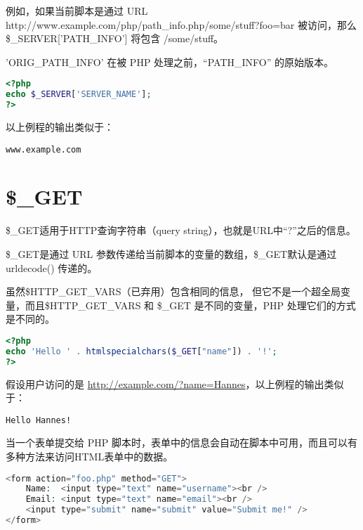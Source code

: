 \begin{compactitem}
例如，如果当前脚本是通过 URL http://www.example.com/php/path\_info.php/some/stuff?foo=bar 被访问，那么 \$\_SERVER['PATH\_INFO'] 将包含 /some/stuff。
\item 'ORIG\_PATH\_INFO'
在被 PHP 处理之前，“PATH\_INFO” 的原始版本。
\end{compactitem}


\begin{lstlisting}[language=PHP]
<?php
echo $_SERVER['SERVER_NAME'];
?>
\end{lstlisting}


以上例程的输出类似于：

\begin{verbatim}
www.example.com
\end{verbatim}


\section{\$\_GET}





\begin{compactitem}
\item \$\_GET适用于HTTP查询字符串（query string），也就是URL中“?”之后的信息。
\item \$\_GET是通过 URL 参数传递给当前脚本的变量的数组，\$\_GET默认是通过 urldecode() 传递的。
\end{compactitem}


虽然\$HTTP\_GET\_VARS（已弃用）包含相同的信息， 但它不是一个超全局变量，而且\$HTTP\_GET\_VARS 和 \$\_GET 是不同的变量，PHP 处理它们的方式是不同的。


\begin{lstlisting}[language=PHP]
<?php
echo 'Hello ' . htmlspecialchars($_GET["name"]) . '!';
?>
\end{lstlisting}


假设用户访问的是 \url{http://example.com/?name=Hannes}，以上例程的输出类似于：

\begin{verbatim}
Hello Hannes!
\end{verbatim}


当一个表单提交给 PHP 脚本时，表单中的信息会自动在脚本中可用，而且可以有多种方法来访问HTML表单中的数据。

\begin{lstlisting}[language=PHP]
<form action="foo.php" method="GET">
    Name:  <input type="text" name="username"><br />
    Email: <input type="text" name="email"><br />
    <input type="submit" name="submit" value="Submit me!" />
</form>
\end{lstlisting}


